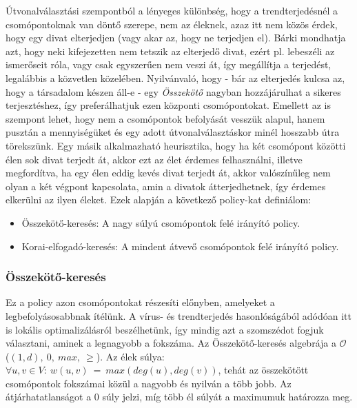     Útvonalválasztási szempontból a lényeges különbség, hogy a trendterjedésnél a csomópontoknak van döntő szerepe, nem az éleknek, azaz itt nem közös érdek, hogy egy divat elterjedjen (vagy akar az, hogy ne terjedjen el). Bárki mondhatja azt, hogy neki kifejezetten nem tetszik az elterjedő divat, ezért pl. lebeszéli az ismerőseit róla, vagy csak egyszerűen nem veszi át, így megállítja a terjedést, legalábbis a közvetlen közelében. Nyilvánvaló, hogy - bár az elterjedés kulcsa az, hogy a társadalom készen áll-e - egy \emph{Összekötő} nagyban hozzájárulhat a sikeres terjesztéshez, így preferálhatjuk ezen központi csomópontokat. Emellett az is szempont lehet, hogy nem a csomópontok befolyását vesszük alapul, hanem pusztán a mennyiségüket és egy adott útvonalválasztáskor minél hosszabb útra törekszünk. Egy másik alkalmazható heurisztika, hogy ha két csomópont közötti élen sok divat terjedt át, akkor ezt az élet érdemes felhasználni, illetve megfordítva, ha egy élen eddig kevés divat terjedt át, akkor valószínűleg nem olyan a két végpont kapcsolata, amin a divatok átterjedhetnek, így érdemes elkerülni az ilyen éleket. Ezek alapján a következő policy-kat definiálom:

    \begin{itemize}
      \item Összekötő-keresés: A nagy súlyú csomópontok felé irányító policy.
      \item Korai-elfogadó-keresés: A mindent átvevő csomópontok felé irányító policy.
    \end{itemize}

      \subsubsection{Összekötő-keresés}

      Ez a policy azon csomópontokat részesíti előnyben, amelyeket a legbefolyásosabbnak ítélünk. A vírus- és trendterjedés hasonlóságából adódóan itt is lokális optimalizálásról beszélhetünk, így mindig azt a szomszédot fogjuk választani, aminek a legnagyobb a fokszáma. Az Összekötő-keresés algebrája a $\mathcal{O}$ ($(1,d),~0,~max,~\geq$). Az élek súlya:
      $\forall u,v \in V:~w(u,v)~=~max(deg(u),deg(v))$, tehát az összekötött csomópontok fokszámai közül a nagyobb és nyilván a több jobb. Az átjárhatatlanságot a 0 súly jelzi, míg több él súlyát a maximumuk határozza meg.

